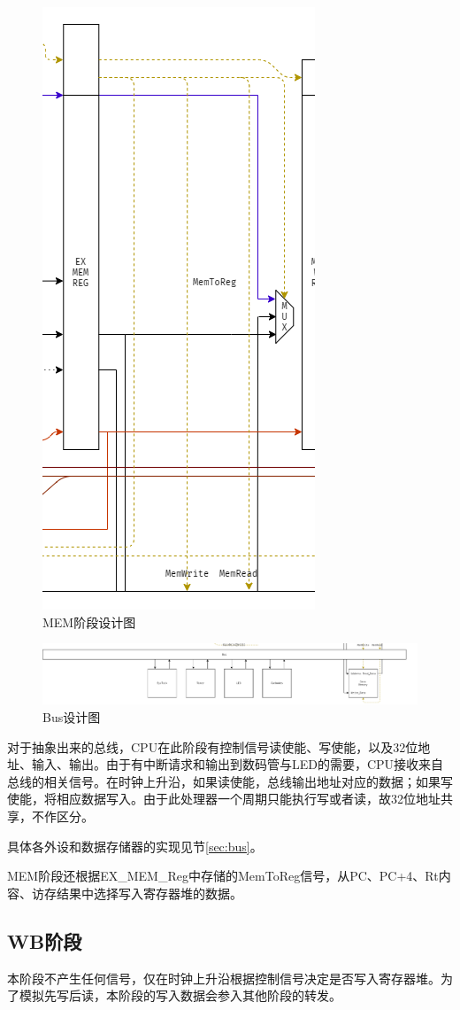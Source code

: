 \documentclass[a4paper]{article}
\begin{document}
\begin{figure}[htb]
    \centering
    \includegraphics[width=.3\textwidth]{../assets/design_MEM.png}
    \caption{MEM阶段设计图}
    \label{fig:MEM_design}
\end{figure}

\begin{figure}[htb]
    \centering
    \includegraphics[width=.9\textwidth]{../assets/design_Bus.png}
    \caption{Bus设计图}
    \label{fig:Bus_design}
\end{figure}

对于抽象出来的总线，CPU在此阶段有控制信号读使能、写使能，以及32位地址、输入、输出。由于有中断请求和输出到数码管与LED的需要，CPU接收来自总线的相关信号。在时钟上升沿，如果读使能，总线输出地址对应的数据；如果写使能，将相应数据写入。由于此处理器一个周期只能执行写或者读，故32位地址共享，不作区分。

具体各外设和数据存储器的实现见节\ref{sec:bus}。

MEM阶段还根据EX\_MEM\_Reg中存储的MemToReg信号，从PC、PC+4、Rt内容、访存结果中选择写入寄存器堆的数据。

\subsection{WB阶段}

本阶段不产生任何信号，仅在时钟上升沿根据控制信号决定是否写入寄存器堆。为了模拟先写后读，本阶段的写入数据会参入其他阶段的转发。
\end{document}
